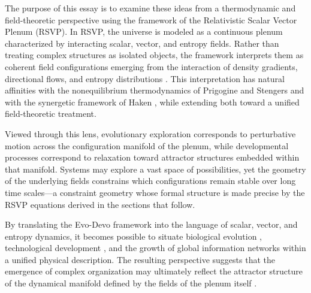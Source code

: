 \documentclass[12pt]{article}
\begin{document}
The purpose of this essay is to examine these ideas from a thermodynamic and field-theoretic perspective using the framework of the Relativistic Scalar Vector Plenum (RSVP). In RSVP, the universe is modeled as a continuous plenum characterized by interacting scalar, vector, and entropy fields. Rather than treating complex structures as isolated objects, the framework interprets them as coherent field configurations emerging from the interaction of density gradients, directional flows, and entropy distributions \cite{prigogine1984,haken1983}. This interpretation has natural affinities with the nonequilibrium thermodynamics of Prigogine and Stengers \cite{prigogine1984} and with the synergetic framework of Haken \cite{haken1983}, while extending both toward a unified field-theoretic treatment.

Viewed through this lens, evolutionary exploration corresponds to perturbative motion across the configuration manifold of the plenum, while developmental processes correspond to relaxation toward attractor structures embedded within that manifold. Systems may explore a vast space of possibilities, yet the geometry of the underlying fields constrains which configurations remain stable over long time scales---a constraint geometry whose formal structure is made precise by the RSVP equations derived in the sections that follow.

By translating the Evo-Devo framework into the language of scalar, vector, and entropy dynamics, it becomes possible to situate biological evolution \cite{kauffman1993,goodwin1994}, technological development \cite{barabasi2016}, and the growth of global information networks \cite{smart2023,dechardin1955} within a unified physical description. The resulting perspective suggests that the emergence of complex organization may ultimately reflect the attractor structure of the dynamical manifold defined by the fields of the plenum itself \cite{bak1996,langton1990}.
\end{document}
